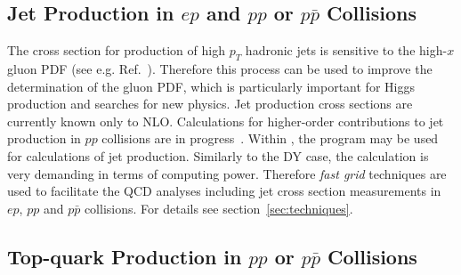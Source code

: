 
\subsection{Jet Production in $ep$ and $pp$ or $p \bar p$ Collisions}
\label{jetsection}

The cross section for production of high $p_T$ hadronic jets
is sensitive to the high-$x$ gluon 
PDF (see e.g. Ref.~\cite{MSTWpdf}). 
Therefore this process can be used to improve the determination of the gluon PDF,
which is particularly important for Higgs production and searches for new physics.
Jet production cross sections are currently known only to NLO.
Calculations for higher-order contributions to jet production in $pp$ collisions
are in progress~\cite{nigel:2013,nigel:2010,Currie:2013dwa}. 
Within \fitter, the \nlojetpp program \cite{Nagy:1998bb,Nagy:2001fj} may be used for 
calculations of jet production.
Similarly to the DY case, the calculation 
is very demanding in terms of computing power. 
Therefore \emph{fast grid} techniques are used  
to facilitate the QCD analyses including jet cross section measurements
in $ep$, $pp$ and $p\bar{p}$ collisions.
For details see section~\ref{sec:techniques}.





\subsection{Top-quark Production in $pp$ or $p \bar p$ Collisions}

